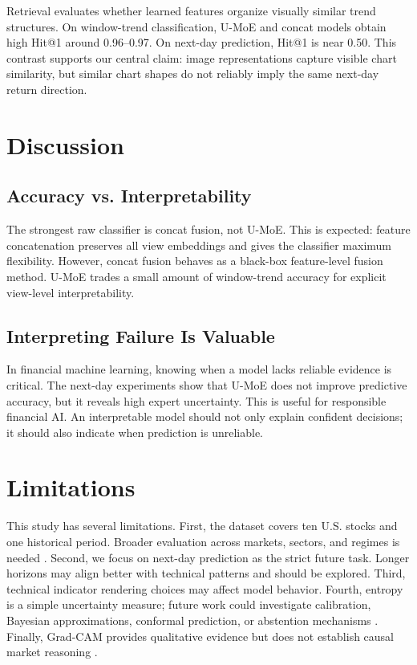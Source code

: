 ﻿\documentclass[conference]{IEEEtran}
\newcommand{\method}{U-MoE}
\begin{document}
Retrieval evaluates whether learned features organize visually similar trend structures. On window-trend classification, \method{} and concat models obtain high Hit@1 around 0.96--0.97. On next-day prediction, Hit@1 is near 0.50. This contrast supports our central claim: image representations capture visible chart similarity, but similar chart shapes do not reliably imply the same next-day return direction.

\section{Discussion}

\subsection{Accuracy vs. Interpretability}
The strongest raw classifier is concat fusion, not \method{}. This is expected: feature concatenation preserves all view embeddings and gives the classifier maximum flexibility. However, concat fusion behaves as a black-box feature-level fusion method. \method{} trades a small amount of window-trend accuracy for explicit view-level interpretability.

\subsection{Interpreting Failure Is Valuable}
In financial machine learning, knowing when a model lacks reliable evidence is critical. The next-day experiments show that \method{} does not improve predictive accuracy, but it reveals high expert uncertainty. This is useful for responsible financial AI. An interpretable model should not only explain confident decisions; it should also indicate when prediction is unreliable.

\section{Limitations}
This study has several limitations. First, the dataset covers ten U.S. stocks and one historical period. Broader evaluation across markets, sectors, and regimes is needed \cite{rouf2021stocksurvey}. Second, we focus on next-day prediction as the strict future task. Longer horizons may align better with technical patterns and should be explored. Third, technical indicator rendering choices may affect model behavior. Fourth, entropy is a simple uncertainty measure; future work could investigate calibration, Bayesian approximations, conformal prediction, or abstention mechanisms \cite{guo2017calibration}. Finally, Grad-CAM provides qualitative evidence but does not establish causal market reasoning \cite{xue2023survey}.
\end{document}
